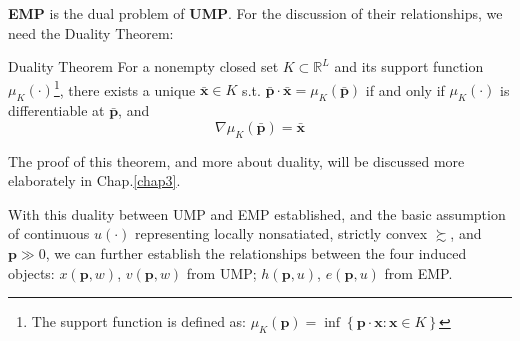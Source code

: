 \textbf{EMP} is the dual problem of \textbf{UMP}. For the discussion of their relationships, we need the Duality Theorem:
\begin{theorem*}{Duality Theorem}{}
    For a nonempty closed set $K\subset\mathbb{R}^L$ and its support function $\mu_{K}(\cdot)$\footnote{The support function is defined as: $\mu_K(\mathbf{p})=\inf\left\{\mathbf{p}\cdot\mathbf{x}:\mathbf{x}\in K\right\}$}, there exists a unique $\bar{\mathbf{x}}\in K$ s.t. $\bar{\mathbf{p}}\cdot\bar{\mathbf{x}}=\mu_K(\bar{\mathbf{p}})$ if and only if $\mu_K(\cdot)$ is differentiable at $\bar{\mathbf{p}}$, and $$ \nabla\mu_K(\bar{\mathbf{p}})=\bar{\mathbf{x}} $$
\end{theorem*}

The proof of this theorem, and more about duality, will be discussed more elaborately in Chap.\ref{chap3}.

With this duality between UMP and EMP established, and the basic assumption of continuous $u(\cdot)$ representing locally nonsatiated, strictly convex $\succsim$, and $\mathbf{p}\gg 0$, we can further establish the relationships between the four induced objects:  $x(\mathbf{p},w)$, $v(\mathbf{p},w)$ from UMP; $h(\mathbf{p},u)$, $e(\mathbf{p},u)$ from EMP.

